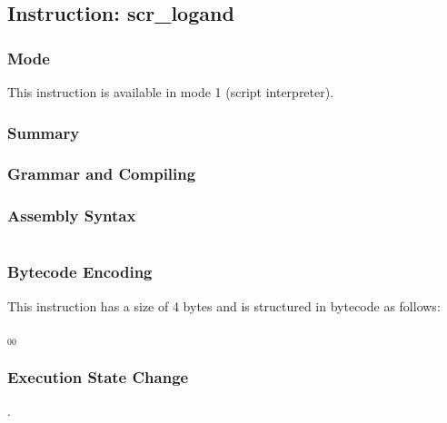 \subsection{Instruction: scr\_logand}

\subsubsection{Mode}
This instruction is available in mode 1 (script interpreter).
\subsubsection{Summary}


\subsubsection{Grammar and Compiling}


\subsubsection{Assembly Syntax}

\begin{myquote}
\begin{verbatim}

\end{verbatim}
\end{myquote}

\subsubsection{Bytecode Encoding}

This instruction has a size of 4 bytes and is structured in bytecode as follows:

$_{00}$\ 


\subsubsection{Execution State Change}

.


